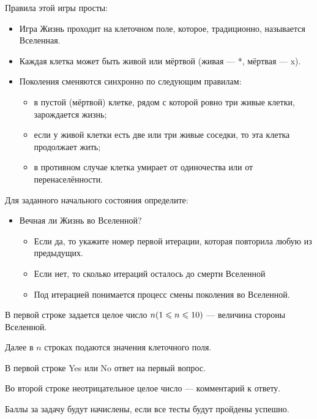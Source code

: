 
Правила этой игры просты:

\begin{itemize}
    \item Игра Жизнь проходит на клеточном поле, которое, традиционно, называется Вселенная.
    \item Каждая клетка может быть живой или мёртвой (живая — *, мёртвая — x).
    \item Поколения сменяются синхронно по следующим правилам:
    \begin{itemize}
        \item в пустой (мёртвой) клетке, рядом с которой ровно три живые клетки, зарождается жизнь;
        \item если у живой клетки есть две или три живые соседки, то эта клетка продолжает жить;
        \item в противном случае клетка умирает от одиночества или от перенаселённости.
    \end{itemize}
\end{itemize}

Для заданного начального состояния определите:

\begin{itemize}
    \item Вечная ли Жизнь во Вселенной?
    \begin{itemize}
        \item Если да, то укажите номер первой итерации, которая повторила любую из предыдущих.
        \item Если нет, то сколько итераций осталось до смерти Вселенной
        \item Под итерацией понимается процесс смены поколения во Вселенной.
    \end{itemize}
\end{itemize}


В первой строке задается целое число $n \space(1\leq n \leq 10)$  — величина стороны Вселенной.

Далее в $n$ строках подаются значения клеточного поля.

\outputfmtSection

В первой строке Yes или No ответ на первый вопрос.

Во второй строке неотрицательное целое число — комментарий к ответу.

\markSection

Баллы за задачу будут начислены, если все тесты будут пройдены успешно.

